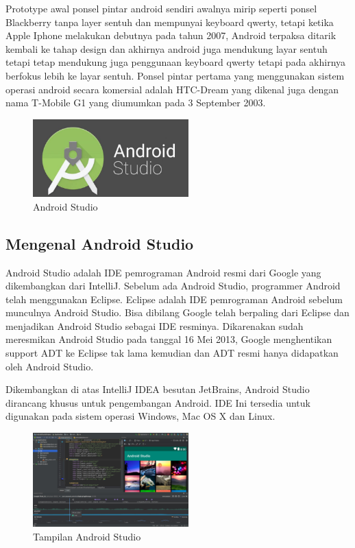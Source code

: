Prototype awal ponsel pintar android sendiri awalnya mirip seperti ponsel Blackberry tanpa layer sentuh dan mempunyai keyboard qwerty, tetapi ketika Apple Iphone melakukan debutnya pada tahun 2007, Android terpaksa ditarik kembali ke tahap design dan akhirnya android juga mendukung layar sentuh tetapi tetap mendukung juga penggunaan keyboard qwerty tetapi pada akhirnya berfokus lebih ke layar sentuh. Ponsel pintar pertama yang menggunakan sistem operasi android secara komersial adalah HTC-Dream yang dikenal juga dengan nama T-Mobile G1 yang diumumkan pada 3 September 2003.
	\begin{figure}[H]
		\includegraphics[width=6cm]{figures/AndroidStudio.jpg}
		\centering
		\caption{Android Studio}
	\end{figure}
\subsection{Mengenal Android Studio}
Android Studio adalah IDE pemrograman Android resmi dari Google yang dikembangkan dari IntelliJ. Sebelum ada Android Studio, programmer Android telah menggunakan Eclipse. Eclipse adalah IDE pemrograman Android sebelum munculnya Android Studio. Bisa dibilang Google telah berpaling dari Eclipse dan menjadikan Android Studio sebagai IDE resminya. Dikarenakan sudah meresmikan Android Studio pada tanggal 16 Mei 2013, Google menghentikan support ADT ke Eclipse tak lama kemudian dan ADT resmi hanya didapatkan oleh Android Studio.

Dikembangkan di atas IntelliJ IDEA besutan JetBrains, Android Studio dirancang khusus untuk pengembangan Android. IDE Ini tersedia untuk digunakan pada sistem operasi Windows, Mac OS X dan Linux.

\begin{figure}[H]
		\includegraphics[width=6cm]{figures/tampilanandroidstudio.jpg}
		\centering
		\caption{Tampilan Android Studio}
	\end{figure}

